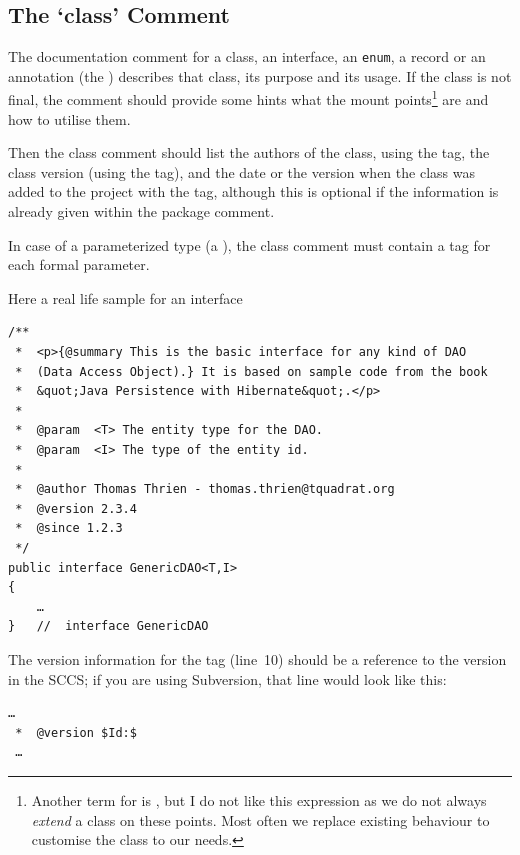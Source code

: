 \subsection{The ‘class’ Comment}\label{sec:ClassComment}
The documentation comment for a class, an interface, an \lstinline|enum|, a record or an annotation (the ) describes that class, its purpose and its usage. If the class is not final, the comment should provide some hints what the mount points\footnote{Another term for  is , but I do not like this expression as we do not always \textit{extend} a class on these points. Most often we replace existing behaviour to customise the class to our needs.} are and how to utilise them.

Then the class comment should list the authors of the class, using the  tag, the class version (using the  tag), and the date or the version when the class was added to the project with the  tag, although this is optional if the information is already given within the package comment.

In case of a parameterized type (a ), the class comment must contain a  tag for each formal parameter.

Here a real life sample for an interface
\begin{lstlisting}
/**
 *  <p>{@summary This is the basic interface for any kind of DAO 
 *  (Data Access Object).} It is based on sample code from the book 
 *  &quot;Java Persistence with Hibernate&quot;.</p>
 *
 *  @param  <T> The entity type for the DAO.
 *  @param  <I> The type of the entity id.
 *
 *  @author Thomas Thrien - thomas.thrien@tquadrat.org
 *  @version 2.3.4
 *  @since 1.2.3
 */
public interface GenericDAO<T,I>
{
    …
}   //  interface GenericDAO
\end{lstlisting}

The version information for the  tag (line~10) should be a reference to the version in the SCCS; if you are using Subversion, that line would look like this:
\begin{lstlisting}[firstnumber=9,language=Comment]
 …
 *  @version $Id:$
 …
\end{lstlisting}

